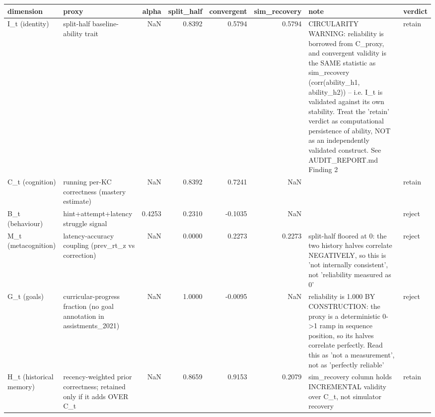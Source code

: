 \begin{tabular}{llrrrrll}
\toprule
dimension & proxy & alpha & split\_half & convergent & sim\_recovery & note & verdict \\
\midrule
I\_t (identity) & split-half baseline-ability trait & NaN & 0.8392 & 0.5794 & 0.5794 & CIRCULARITY WARNING: reliability is borrowed from C\_proxy, and convergent validity is the SAME statistic as sim\_recovery (corr(ability\_h1, ability\_h2)) -- i.e. I\_t is validated against its own stability. Treat the 'retain' verdict as computational persistence of ability, NOT as an independently validated construct. See AUDIT\_REPORT.md Finding 2 & retain \\
C\_t (cognition) & running per-KC correctness (mastery estimate) & NaN & 0.8392 & 0.7241 & NaN &  & retain \\
B\_t (behaviour) & hint+attempt+latency struggle signal & 0.4253 & 0.2310 & -0.1035 & NaN &  & reject \\
M\_t (metacognition) & latency-accuracy coupling (prev\_rt\_z vs correction) & NaN & 0.0000 & 0.2273 & 0.2273 & split-half floored at 0: the two history halves correlate NEGATIVELY, so this is 'not internally consistent', not 'reliability measured as 0' & reject \\
G\_t (goals) & curricular-progress fraction (no goal annotation in assistments\_2021) & NaN & 1.0000 & -0.0095 & NaN & reliability is 1.000 BY CONSTRUCTION: the proxy is a deterministic 0->1 ramp in sequence position, so its halves correlate perfectly. Read this as 'not a measurement', not as 'perfectly reliable' & reject \\
H\_t (historical memory) & recency-weighted prior correctness; retained only if it adds OVER C\_t & NaN & 0.8659 & 0.9153 & 0.2079 & sim\_recovery column holds INCREMENTAL validity over C\_t, not simulator recovery & retain \\
\bottomrule
\end{tabular}
